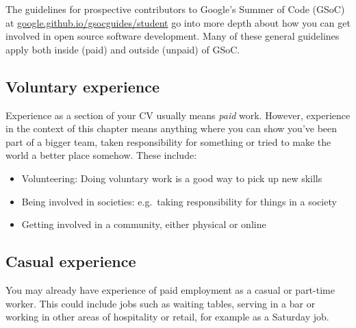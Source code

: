 \documentclass[
]{book}
\providecommand{\tightlist}{%
  \setlength{\itemsep}{0pt}\setlength{\parskip}{0pt}}
\begin{document}
The guidelines for prospective contributors to Google's Summer of Code (GSoC) at \href{https://google.github.io/gsocguides/student/}{google.github.io/gsocguides/student} go into more depth about how you can get involved in open source software development. Many of these general guidelines apply both inside (paid) and outside (unpaid) of GSoC. \citep{gsoc}

\hypertarget{volunteering}{%
\subsection{Voluntary experience}\label{volunteering}}

Experience as a section of your CV usually means \emph{paid} work. However, experience in the context of this chapter means anything where you can show you've been part of a bigger team, taken responsibility for something or tried to make the world a better place somehow. These include:

\begin{itemize}
\tightlist
\item
  Volunteering: Doing voluntary work is a good way to pick up new skills
\item
  Being involved in societies: e.g.~taking responsibility for things in a society
\item
  Getting involved in a community, either physical or online
\end{itemize}

\hypertarget{casual}{%
\subsection{Casual experience}\label{casual}}

You may already have experience of paid employment as a casual or part-time worker. This could include jobs such as waiting tables, serving in a bar or working in other areas of hospitality or retail, for example as a Saturday job.
\end{document}
